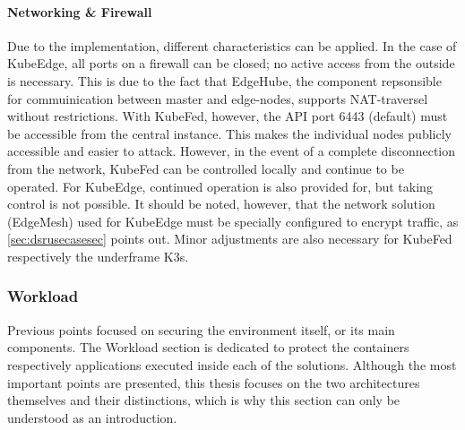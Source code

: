 \documentclass[MSC,Master,english]{twbook}%
\begin{document}
\paragraph{Networking \& Firewall} Due to the implementation, different characteristics can be applied. In the case of KubeEdge, all ports on a firewall can be closed; no active access from the outside is necessary. This is due to the fact that EdgeHube, the component repsonsible for commuinication between master and edge-nodes, supports \ac{NAT}-traversel without restrictions.
With KubeFed, however, the API port 6443 (default) must be accessible from the central instance. This makes the individual nodes publicly accessible and easier to attack. However, in the event of a complete disconnection from the network, KubeFed can be controlled locally and continue to be operated. For KubeEdge, continued operation is also provided for, but taking control is not possible. It should be noted, however, that the network solution (EdgeMesh) used for KubeEdge must be specially configured to encrypt traffic, as \autoref{sec:dsrusecasesec} points out. Minor adjustments are also necessary for KubeFed respectively the underframe K3s.

\subsubsection{Workload} Previous points focused on securing the environment itself, or its main components. The Workload section is dedicated to protect the containers respectively applications executed inside each of the solutions. Although the most important points are presented, this thesis focuses on the two architectures themselves and their distinctions, which is why this section can only be understood as an introduction.
\end{document}
